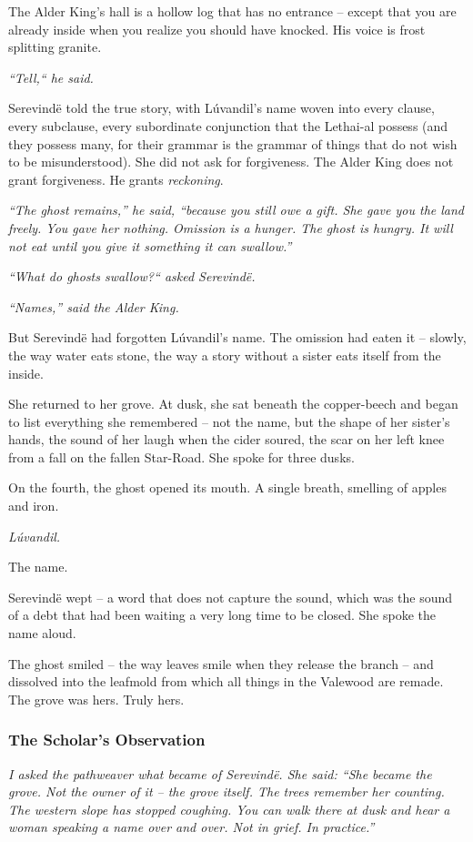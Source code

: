 \documentclass[12pt]{article}
\begin{document}
The Alder King's hall is a hollow log that has no entrance -- except that you are already inside when you realize you should have knocked. His voice is frost splitting granite.

\textit{``Tell,`` he said.}

Serevindë told the true story, with Lúvandil's name woven into every clause, every subclause, every subordinate conjunction that the Lethai-al possess (and they possess many, for their grammar is the grammar of things that do not wish to be misunderstood). She did not ask for forgiveness. The Alder King does not grant forgiveness. He grants \textit{reckoning}.

\textit{``The ghost remains,'' he said, ``because you still owe a gift. She gave you the land freely. You gave her nothing. Omission is a hunger. The ghost is hungry. It will not eat until you give it something it can swallow.''}

\textit{``What do ghosts swallow?`` asked Serevindë.}

\textit{``Names,'' said the Alder King.}

But Serevindë had forgotten Lúvandil's name. The omission had eaten it -- slowly, the way water eats stone, the way a story without a sister eats itself from the inside.

She returned to her grove. At dusk, she sat beneath the copper-beech and began to list everything she remembered -- not the name, but the shape of her sister's hands, the sound of her laugh when the cider soured, the scar on her left knee from a fall on the fallen Star-Road. She spoke for three dusks.

On the fourth, the ghost opened its mouth. A single breath, smelling of apples and iron.

\textit{Lúvandil.}

The name.

Serevindë wept -- a word that does not capture the sound, which was the sound of a debt that had been waiting a very long time to be closed. She spoke the name aloud.

The ghost smiled -- the way leaves smile when they release the branch -- and dissolved into the leafmold from which all things in the Valewood are remade. The grove was hers. Truly hers.

\subsubsection{The Scholar's Observation}
\textit{I asked the pathweaver what became of Serevindë. She said: ``She became the grove. Not the owner of it -- the grove itself. The trees remember her counting. The western slope has stopped coughing. You can walk there at dusk and hear a woman speaking a name over and over. Not in grief. In practice.''}
\end{document}
